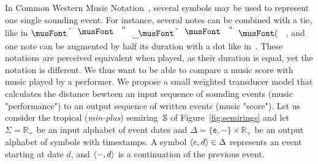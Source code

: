 \begin{example}
In Common Western Music Notation~\cite{Gould11Notation}, 
several symbols may be used to represent one single sounding event. 
For instance, several notes can be combined with a tie, 
like in $\musQuarter\!\!\!\mathrel{\raisebox{-1.5mm}{$\smile$}}\!\!\!\musEighth$,  
and one note can be augmented by half its duration with a dot like in~\musQuarterDotted{}.
These notations are perceived equivalent when played, as their duration is equal, yet the notation is different.
We thus want to be able to compare a music score with music played by a performer. 
%
\noindent 
We propose a small weighted transducer model that calculates the distance bewteen an input sequence of sounding 
events (music "performance") 
to an output sequence of written events (music "score").
%
Let us consider the tropical (\emph{min-plus}) semiring~$\mathbb{S}$ 
of Figure~\ref{fig:semirings} and 
let $\Sigma = \mathbb{R}_+$ be an input alphabet of event dates
and $\Delta = \{ \mathsf{e}, \mathsf{-} \} \times \mathbb{R}_+$ 
be an output alphabet of symbols with timestamps. 
A symbol $\< \mathsf{e}, d > \in \Delta$ represents an event starting at date $d$, 
and $\< \mathsf{-}, d >$ is a continuation of the previous event.


\end{example}

